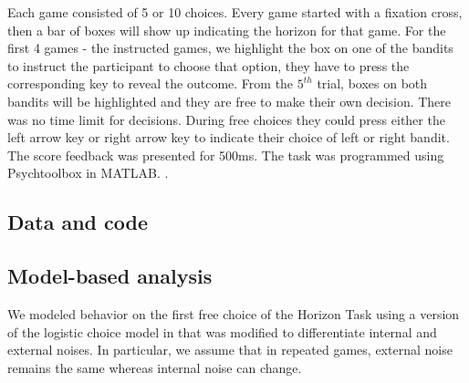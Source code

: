 \documentclass[12pt]{article}
\begin{document}
	Each game consisted of 5 or 10 choices. Every game started with a fixation cross, then a bar of boxes will show up indicating the horizon for that game. For the first 4 games - the instructed games, we highlight the box on one of the bandits to instruct the participant to choose that option, they have to press the corresponding key to reveal the outcome. From the $5^{th}$ trial, boxes on both bandits will be highlighted and they are free to make their own decision. There was no time limit for decisions. During free choices they could press either the left arrow key or right arrow key to indicate their choice of left or right bandit. The score feedback was presented for 500ms. The task was programmed using Psychtoolbox in MATLAB. \cite{}.
	
	
	
	
	
	\subsection*{Data and code}
	
	
	\subsection*{Model-based analysis}
	We modeled behavior on the first free choice of the Horizon Task using a version of the logistic choice model in \cite{} that was modified to differentiate internal and external noises. In particular, we assume that in repeated games, external noise remains the same whereas internal noise can change. 
	
\end{document}
